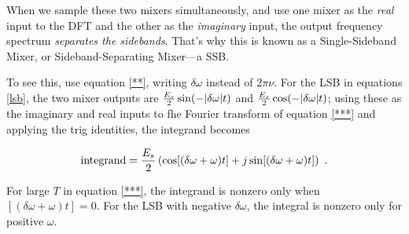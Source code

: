 \documentclass[11pt,preprint]{aastex}
\begin{document}
When we sample these two mixers simultaneously, and use one mixer as the
{\it real} input to the DFT and the other as the {\it imaginary} input,
the output frequency spectrum {\it separates the sidebands}. That's why
this is known as a Single-Sideband Mixer, or Sideband-Separating
Mixer---a SSB. 

To see this, use equation \ref{**}, writing $\delta \omega$ instead of
$2 \pi \nu$.  For the LSB in equations \ref{lsb}, the two mixer outputs
are ${E_s \over 2} \sin(-|\delta \omega|t)$ and ${E_s \over 2}
\cos(-|\delta \omega|t)$; using these as the imaginary and real inputs
to fhe Fourier transform of equation \ref{***} and applying the trig
identities, the integrand becomes

\begin{equation}
{\rm integrand} = {E_s \over 2} \left( \cos[(\delta \omega +
    \omega)t] + j \sin[(\delta \omega + \omega)t] \right) \ .
\end{equation}

\noindent For large $T$ in equation \ref{***}, the integrand is nonzero
only when $[(\delta \omega + \omega)t] =0$. For the LSB with negative
$\delta \omega$, the integral is nonzero only for positive $\omega$.
\end{document}
